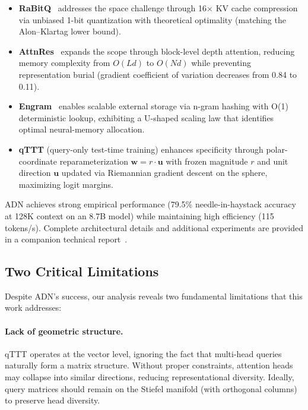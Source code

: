\documentclass[twocolumn]{article}
\begin{document}
\begin{itemize}
    \item \textbf{RaBitQ}~\cite{rabitq} addresses the space challenge through 16$\times$ KV cache compression via unbiased 1-bit quantization with theoretical optimality (matching the Alon--Klartag lower bound).
    
    \item \textbf{AttnRes}~\cite{attnres} expands the scope through block-level depth attention, reducing memory complexity from $O(Ld)$ to $O(Nd)$ while preventing representation burial (gradient coefficient of variation decreases from 0.84 to 0.11).
    
    \item \textbf{Engram}~\cite{engram} enables scalable external storage via n-gram hashing with O(1) deterministic lookup, exhibiting a U-shaped scaling law that identifies optimal neural-memory allocation.
    
    \item \textbf{qTTT} (query-only test-time training) enhances specificity through polar-coordinate reparameterization $\mathbf{w} = r \cdot \mathbf{u}$ with frozen magnitude $r$ and unit direction $\mathbf{u}$ updated via Riemannian gradient descent on the sphere, maximizing logit margins.
\end{itemize}

ADN achieves strong empirical performance (79.5\% needle-in-haystack accuracy at 128K context on an 8.7B model) while maintaining high efficiency (115 tokens/s). Complete architectural details and additional experiments are provided in a companion technical report~\cite{adn}.

\subsection{Two Critical Limitations}

Despite ADN's success, our analysis reveals two fundamental limitations that this work addresses:

\paragraph{Lack of geometric structure.} 
qTTT operates at the vector level, ignoring the fact that multi-head queries naturally form a matrix structure. Without proper constraints, attention heads may collapse into similar directions, reducing representational diversity. Ideally, query matrices should remain on the Stiefel manifold (with orthogonal columns) to preserve head diversity.
\end{document}
